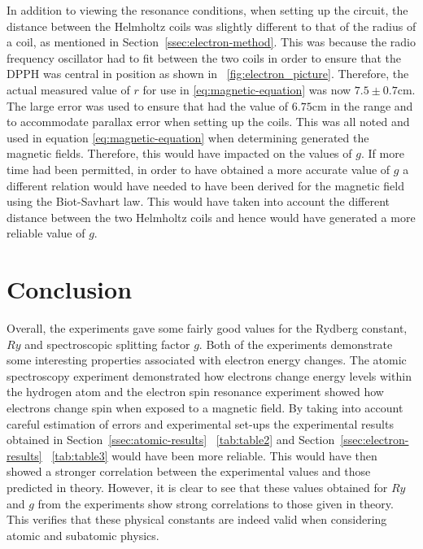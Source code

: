 \documentclass{article}
\newcommand{\figref}[2][\figurename~]{#1\ref{#2}}
\newcommand{\tabref}[2][\tablename~]{#1\ref{#2}}
\newcommand{\secref}[2][Section~]{#1\ref{#2}}
\begin{document}
\vspace{2mm}
\noindent
In addition to viewing the resonance conditions, when setting up the circuit, the distance between the Helmholtz coils was slightly different to that of the radius of a coil, as mentioned in \secref{ssec:electron-method}. This was because the radio frequency oscillator had to fit between the two coils in order to ensure that the DPPH was central in position as shown in \figref{fig:electron_picture}. Therefore, the actual measured value of $r$ for use in \eqref{eq:magnetic-equation} was now $7.5 \pm0.7$cm. The large error was used to ensure that had the value of $6.75$cm in the range and to accommodate parallax error when setting up the coils. This was all noted and used in equation \eqref{eq:magnetic-equation} when determining generated the magnetic fields. Therefore, this would have impacted on the values of $g$. If more time had been permitted, in order to have obtained a more accurate value of $g$ a different relation would have needed to have been derived for the magnetic field using the Biot-Savhart law. This would have taken into account the different distance between the two Helmholtz coils and hence would have generated a more reliable value of $g$.


\section{Conclusion}
\label{sec:conclusion}
Overall, the experiments gave some fairly good values for the Rydberg constant, $Ry$ and spectroscopic splitting factor $g$. Both of the experiments demonstrate some interesting properties associated with electron energy changes. The atomic spectroscopy experiment demonstrated how electrons change energy levels within the hydrogen atom and the electron spin resonance experiment showed how electrons change spin when exposed to a magnetic field. By taking into account careful estimation of errors and experimental set-ups the experimental results obtained in \secref{ssec:atomic-results} \tabref{tab:table2} and \secref{ssec:electron-results} \tabref{tab:table3} would have been more reliable. This would have then showed a stronger correlation between the experimental values and those predicted in theory. However, it is clear to see that these values obtained  for $Ry$ and $g$ from the experiments show strong correlations to those given in theory. This verifies that these physical constants are indeed valid when considering atomic and subatomic physics. 
\end{document}
